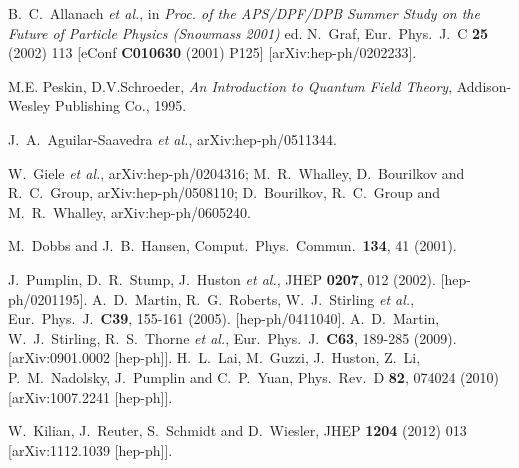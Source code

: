 \documentclass[12pt]{book}
\begin{document}
\begin{thebibliography}{19}
  B.~C.~Allanach {\it et al.},
  in {\it Proc. of the APS/DPF/DPB Summer Study on the Future of Particle Physics (Snowmass 2001) } ed. N.~Graf,
  Eur.\ Phys.\ J.\ C {\bf 25} (2002) 113
  [eConf {\bf C010630} (2001) P125]
  [arXiv:hep-ph/0202233].

  M.E. Peskin, D.V.Schroeder, {\em An Introduction to Quantum Field
    Theory}, Addison-Wesley Publishing Co., 1995.

J.~A.~Aguilar-Saavedra {\it et al.},
arXiv:hep-ph/0511344.

  W.~Giele {\it et al.},
  arXiv:hep-ph/0204316;
  M.~R.~Whalley, D.~Bourilkov and R.~C.~Group,
  arXiv:hep-ph/0508110;
  D.~Bourilkov, R.~C.~Group and M.~R.~Whalley,
  arXiv:hep-ph/0605240.

  M.~Dobbs and J.~B.~Hansen,
  Comput.\ Phys.\ Commun.\  {\bf 134}, 41 (2001).

  J.~Pumplin, D.~R.~Stump, J.~Huston {\it et al.},
  JHEP {\bf 0207}, 012 (2002).
  [hep-ph/0201195].
  A.~D.~Martin, R.~G.~Roberts, W.~J.~Stirling {\it et al.},
  Eur.\ Phys.\ J.\  {\bf C39}, 155-161 (2005).
  [hep-ph/0411040].
  A.~D.~Martin, W.~J.~Stirling, R.~S.~Thorne {\it et al.},
  Eur.\ Phys.\ J.\  {\bf C63}, 189-285 (2009).
  [arXiv:0901.0002 [hep-ph]].
  H.~L.~Lai, M.~Guzzi, J.~Huston, Z.~Li, P.~M.~Nadolsky, J.~Pumplin and C.~P.~Yuan,
  Phys.\ Rev.\  D {\bf 82}, 074024 (2010)
  [arXiv:1007.2241 [hep-ph]].

  W.~Kilian, J.~Reuter, S.~Schmidt and D.~Wiesler,
  JHEP {\bf 1204} (2012) 013
  [arXiv:1112.1039 [hep-ph]].
\end{thebibliography}
\end{document}
